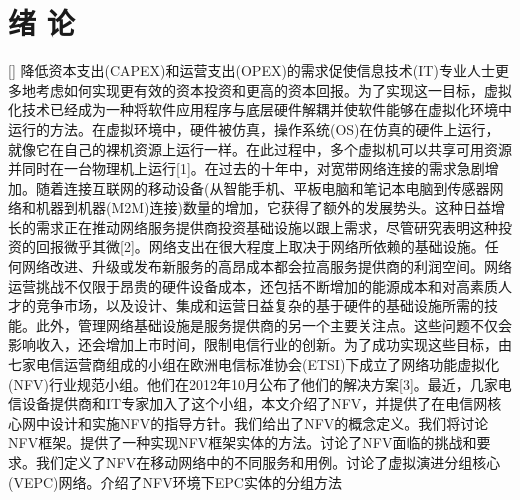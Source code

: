 \chapter[绪 论]{绪 论}[]
降低资本支出(CAPEX)和运营支出(OPEX)的需求促使信息技术(IT)专业人士更多地考虑如何实现更有效的资本投资和更高的资本回报。为了实现这一目标，虚拟化技术已经成为一种将软件应用程序与底层硬件解耦并使软件能够在虚拟化环境中运行的方法。在虚拟环境中，硬件被仿真，操作系统(OS)在仿真的硬件上运行，就像它在自己的裸机资源上运行一样。在此过程中，多个虚拟机可以共享可用资源并同时在一台物理机上运行[1]。在过去的十年中，对宽带网络连接的需求急剧增加。随着连接互联网的移动设备(从智能手机、平板电脑和笔记本电脑到传感器网络和机器到机器(M2M)连接)数量的增加，它获得了额外的发展势头。这种日益增长的需求正在推动网络服务提供商投资基础设施以跟上需求，尽管研究表明这种投资的回报微乎其微[2]。网络支出在很大程度上取决于网络所依赖的基础设施。任何网络改进、升级或发布新服务的高昂成本都会拉高服务提供商的利润空间。网络运营挑战不仅限于昂贵的硬件设备成本，还包括不断增加的能源成本和对高素质人才的竞争市场，以及设计、集成和运营日益复杂的基于硬件的基础设施所需的技能。此外，管理网络基础设施是服务提供商的另一个主要关注点。这些问题不仅会影响收入，还会增加上市时间，限制电信行业的创新。为了成功实现这些目标，由七家电信运营商组成的小组在欧洲电信标准协会(ETSI)下成立了网络功能虚拟化(NFV)行业规范小组。他们在2012年10月公布了他们的解决方案[3]。最近，几家电信设备提供商和IT专家加入了这个小组，本文介绍了NFV，并提供了在电信网核心网中设计和实施NFV的指导方针。我们给出了NFV的概念定义。我们将讨论NFV框架。提供了一种实现NFV框架实体的方法。讨论了NFV面临的挑战和要求。我们定义了NFV在移动网络中的不同服务和用例。讨论了虚拟演进分组核心(VEPC)网络。介绍了NFV环境下EPC实体的分组方法